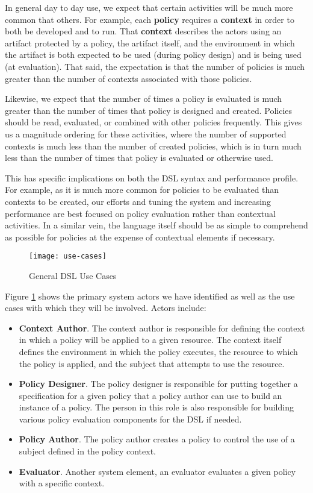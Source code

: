In general day to day use, we expect that certain activities will be much more common that others.  For example, each \textbf{policy} requires a \textbf{context} in order to both be developed and to run.  That \textbf{context} describes the actors using an artifact protected by a policy, the artifact itself, and the environment in which the artifact is both expected to be used (during policy design) and is being used (at evaluation).  That said, the expectation is that the number of policies is much greater than the number of contexts associated with those policies.

Likewise, we expect that the number of times a policy is evaluated is much greater than the number of times that policy is designed and created.  Policies should be read, evaluated, or combined with other policies frequently.  This gives us a magnitude ordering for these activities, where the number of supported contexts is much less than the number of created policies, which is in turn much less than the number of times that policy is evaluated or otherwise used.

This has specific implications on both the DSL syntax and performance profile.  For example, as it is much more common for policies to be evaluated than contexts to be created, our efforts and tuning the system and increasing performance are best focused on policy evaluation rather than contextual activities.  In a similar vein, the language itself should be as simple to comprehend as possible for policies at the expense of contextual elements if necessary.

\begin{figure}[!t]
\centering
\texttt{[image: use-cases]}
\caption{General DSL Use Cases}
\label{fig:model:use-cases}
\end{figure}

Figure \ref{fig:model:use-cases} shows the primary system actors we have identified as well as the use cases with which they will be involved.  Actors include:
\begin{itemize}
\item \textbf{Context Author}.  The context author is responsible for defining the context in which a policy will be applied to a given resource.  The context itself defines the environment in which the policy executes, the resource to which the policy is applied, and the subject that attempts to use the resource.
\item \textbf{Policy Designer}.  The policy designer is responsible for putting together a specification for a given policy that a policy author can use to build an instance of a policy.  The person in this role is also responsible for building various policy evaluation components for the DSL if needed.  
\item \textbf{Policy Author}.  The policy author creates a policy to control the use of a subject defined in the policy context.
\item \textbf{Evaluator}. Another system element, an evaluator evaluates a given policy with a specific context.
\end{itemize}

